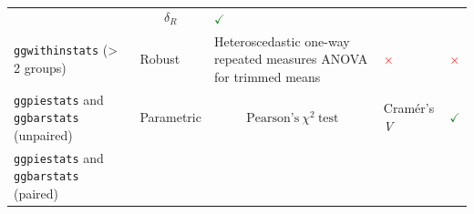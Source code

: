 \documentclass[
]{article}
\begin{document}
\begin{longtable}[]{@{}lllll@{}}
\begin{minipage}[t]{0.31\columnwidth}
\end{minipage} & \begin{minipage}[t]{0.12\columnwidth}\raggedright
\[\delta_{R}\]\strut
\end{minipage} & \begin{minipage}[t]{0.07\columnwidth}\raggedright
\textcolor{ForestGreen}{$\checkmark$}\strut
\end{minipage}\tabularnewline
\begin{minipage}[t]{0.20\columnwidth}\raggedright
\texttt{ggwithinstats} (\textgreater{} 2 groups)\strut
\end{minipage} & \begin{minipage}[t]{0.16\columnwidth}\raggedright
Robust\strut
\end{minipage} & \begin{minipage}[t]{0.31\columnwidth}\raggedright
Heteroscedastic one-way repeated measures ANOVA for trimmed means\strut
\end{minipage} & \begin{minipage}[t]{0.12\columnwidth}\raggedright
\textcolor{red}{$\times$}\strut
\end{minipage} & \begin{minipage}[t]{0.07\columnwidth}\raggedright
\textcolor{red}{$\times$}\strut
\end{minipage}\tabularnewline
\begin{minipage}[t]{0.20\columnwidth}\raggedright
\texttt{ggpiestats} and \texttt{ggbarstats} (unpaired)\strut
\end{minipage} & \begin{minipage}[t]{0.16\columnwidth}\raggedright
Parametric\strut
\end{minipage} & \begin{minipage}[t]{0.31\columnwidth}\raggedright
\[\text{Pearson's}~ \chi^2 ~\text{test}\]\strut
\end{minipage} & \begin{minipage}[t]{0.12\columnwidth}\raggedright
Cramér's \emph{V}\strut
\end{minipage} & \begin{minipage}[t]{0.07\columnwidth}\raggedright
\textcolor{ForestGreen}{$\checkmark$}\strut
\end{minipage}\tabularnewline
\begin{minipage}[t]{0.20\columnwidth}\raggedright
\texttt{ggpiestats} and \texttt{ggbarstats} (paired)\strut
\end{minipage} & \begin{minipage}[t]{0.16\columnwidth}\raggedright

\end{minipage}
\end{longtable}
\end{document}
